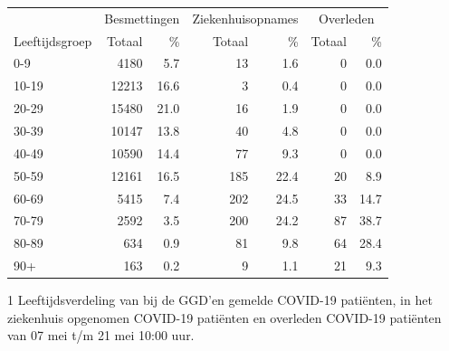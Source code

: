 \documentclass[
  english,
  man,floatsintext]{apa6}
\begin{document}
\begin{table}
\centering\begingroup\fontsize{11}{13}\selectfont

\begin{threeparttable}
\begin{tabular}{lrrrrrr}
\toprule
\multicolumn{1}{c}{ } & \multicolumn{2}{c}{Besmettingen} & \multicolumn{2}{c}{Ziekenhuisopnames} & \multicolumn{2}{c}{Overleden} \\
\cmidrule(l{3pt}r{3pt}){2-3} \cmidrule(l{3pt}r{3pt}){4-5} \cmidrule(l{3pt}r{3pt}){6-7}
Leeftijdsgroep & Totaal & \% & Totaal & \% & Totaal & \%\\
\midrule
0-9 & 4180 & 5.7 & 13 & 1.6 & 0 & 0.0\\
10-19 & 12213 & 16.6 & 3 & 0.4 & 0 & 0.0\\
20-29 & 15480 & 21.0 & 16 & 1.9 & 0 & 0.0\\
30-39 & 10147 & 13.8 & 40 & 4.8 & 0 & 0.0\\
40-49 & 10590 & 14.4 & 77 & 9.3 & 0 & 0.0\\
50-59 & 12161 & 16.5 & 185 & 22.4 & 20 & 8.9\\
60-69 & 5415 & 7.4 & 202 & 24.5 & 33 & 14.7\\
70-79 & 2592 & 3.5 & 200 & 24.2 & 87 & 38.7\\
80-89 & 634 & 0.9 & 81 & 9.8 & 64 & 28.4\\
90+ & 163 & 0.2 & 9 & 1.1 & 21 & 9.3\\
\bottomrule
\end{tabular}
\begin{tablenotes}
\item[1] Leeftijdsverdeling van bij de GGD’en gemelde COVID-19 patiënten, in het ziekenhuis opgenomen COVID-19 patiënten en overleden COVID-19 patiënten van 07 mei t/m 21 mei 10:00 uur.
\end{tablenotes}
\end{threeparttable}
\endgroup{}
\end{table}

\newpage
\end{document}
